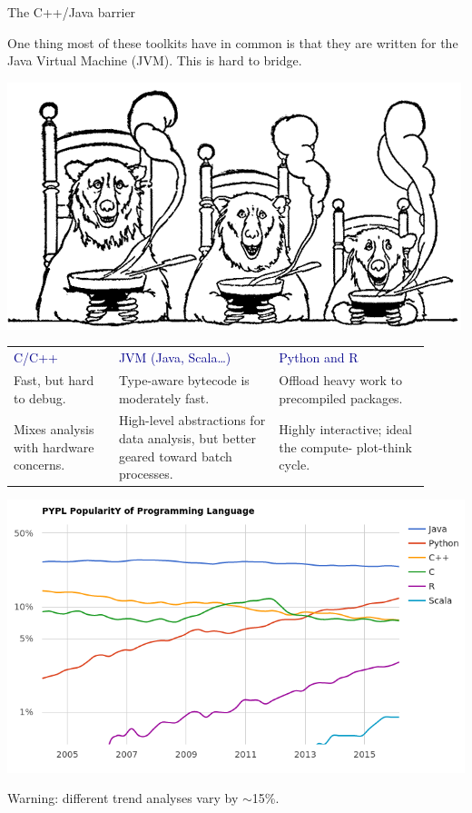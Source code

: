 \documentclass{beamer}
\begin{document}
\begin{frame}{The C++/Java barrier}

\vspace{0.2 cm}
One thing most of these toolkits have in common is that they are written for the Java Virtual Machine (JVM). This is hard to bridge.

\begin{center}
\includegraphics[width=0.5\linewidth]{three_bears.png}
\end{center}

\renewcommand{\arraystretch}{1.2} \begin{tabular}{>{\raggedright}p{0.23\linewidth} >{\raggedright}p{0.35\linewidth} >{\raggedright\arraybackslash}p{0.33\linewidth}}
\textcolor{darkblue}{C/C++} & \textcolor{darkblue}{JVM (Java, Scala\ldots)} & \textcolor{darkblue}{Python and R} \\
\vspace{-0.4 cm} Fast, but hard to debug. & \vspace{-0.4 cm} Type-aware bytecode is moderately fast. & \vspace{-0.4 cm} Offload heavy work to precompiled packages. \\
Mixes analysis with hardware concerns. & High-level abstractions for data analysis, but better geared toward batch processes. & Highly interactive; ideal the compute- plot-think cycle.
\end{tabular}
\end{frame}

\begin{frame}{}
\vfill
\includegraphics[width=\linewidth]{language_trends.png}

\vfill
Warning: different trend analyses vary by $\sim$15\%.
\end{frame}
\end{document}
